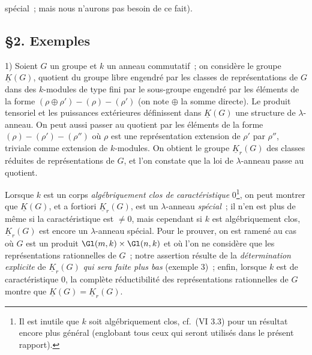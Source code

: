 spécial~; mais nous n'aurons pas besoin de ce fait).

\subsection*{\S 2. Exemples}

1) Soient $G$ un groupe et $k$ un anneau commutatif~; on considère le groupe $\underline{K}(G)$, quotient du groupe libre engendré par les classes de représentations de $G$ dans des $k$-modules de type fini par le sous-groupe engendré par les éléments de la forme $(\rho\oplus\rho')-(\rho)-(\rho')$ (on note $\oplus$ la somme directe). Le produit tensoriel et les puissances extérieures définissent dans $\underline{K}(G)$ une structure de $\lambda$-anneau. On peut aussi passer au quotient par les éléments de la forme $(\rho)-(\rho')-(\rho'')$ où $\rho$ est une représentation extension de $\rho'$ par $\rho''$, triviale comme extension de $k$-modules. On obtient le groupe $\underline{K}_r(G)$ des classes réduites de représentations de $G$, et l'on constate que la loi de $\lambda$-anneau passe au quotient.

Lorsque $k$ est un corps \emph{algébriquement clos de caractéristique} $0$\footnote{Il est inutile que $k$ soit algébriquement clos, cf.\ (VI 3.3) pour un résultat encore plus général (englobant tous ceux qui seront utilisés dans le présent rapport).}, on peut montrer que $\underline{K}(G)$, et a fortiori $\underline{K}_r(G)$, est un $\lambda$-anneau \emph{spécial}~; il n'en est plus de même si la caractéristique est $\neq 0$, mais cependant si $k$ est algébriquement clos\footnotemark[\value{footnote}], $\underline{K}_r(G)$ est encore un $\lambda$-anneau spécial. Pour le prouver, on est ramené au cas où $G$ est un produit $\Gl(m,k)\times\Gl(n,k)$ et où l'on ne considère que les représentations rationnelles de $G$~; notre assertion résulte de la \emph{détermination explicite} de $\underline{K}_r(G)$ \emph{qui sera faite plus bas} (exemple 3)~; enfin, lorsque $k$ est de caractéristique $0$, la complète réductibilité des représentations rationnelles de $G$ montre que $\underline{K}(G)=\underline{K}_r(G)$.


